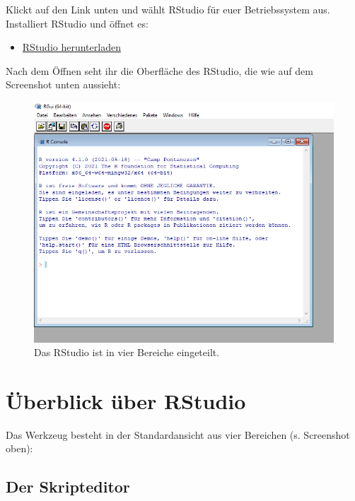 \documentclass[
]{book}
\providecommand{\tightlist}{%
  \setlength{\itemsep}{0pt}\setlength{\parskip}{0pt}}
\begin{document}
Klickt auf den Link unten und wählt RStudio für euer Betriebssystem aus. Installiert RStudio und öffnet es:

\begin{itemize}
\tightlist
\item
  \href{https://www.rstudio.com/products/rstudio/download/\#download}{RStudio herunterladen}
\end{itemize}

Nach dem Öffnen seht ihr die Oberfläche des RStudio, die wie auf dem Screenshot unten aussieht:

\begin{figure}
\includegraphics[width=1\linewidth]{fig/screenshot_r_console} \caption{Das RStudio ist in vier Bereiche eingeteilt.}\label{fig:screenshot-rstudio}
\end{figure}

\hypertarget{uxfcberblick-uxfcber-rstudio}{%
\section{Überblick über RStudio}\label{uxfcberblick-uxfcber-rstudio}}

Das Werkzeug besteht in der Standardansicht aus vier Bereichen (s. Screenshot oben):

\hypertarget{der-skripteditor}{%
\subsection{Der Skripteditor}\label{der-skripteditor}}
\end{document}
